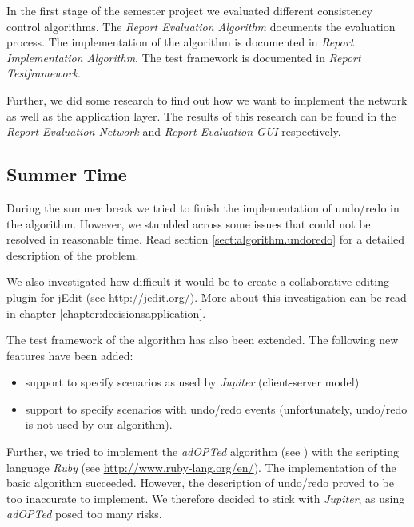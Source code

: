 In the first stage of the semester project we evaluated different
consistency control algorithms. The \emph{Report Evaluation Algorithm}
documents the evaluation process. The implementation of the
algorithm is documented in \emph{Report Implementation Algorithm}. The
test framework is documented in \emph{Report Testframework}.

Further, we did some research to find out how we want to implement the
network as well as the application layer. The results of this research
can be found in the \emph{Report Evaluation Network} and 
\emph{Report Evaluation GUI} respectively.


\subsection{Summer Time}
During the summer break we tried to finish the implementation of undo/redo
in the algorithm. However, we stumbled across some issues that could not
be resolved in reasonable time. Read section \ref{sect:algorithm.undoredo} for
a detailed description of the problem.

We also investigated how difficult it would be to create a collaborative 
editing plugin for jEdit (see \href{http://jedit.org/}{http://jedit.org/}).
More about this investigation can be read in chapter 
\ref{chapter:decisionsapplication}.

The test framework of the algorithm has also been extended. The following 
new features have been added:
\begin{itemize}
 \item support to specify scenarios as used by \emph{Jupiter} (client-server model)
 \item support to specify scenarios with undo/redo events (unfortunately, undo/redo is not used by our algorithm).
\end{itemize}

Further, we tried to implement the \emph{adOPTed} algorithm (see 
\cite{ressel96}) with the scripting language \emph{Ruby} (see
\href{http://www.ruby-lang.org/en/}{http://www.ruby-lang.org/en/}). The
implementation of the basic algorithm succeeded. However, the description
of undo/redo proved to be too inaccurate to implement. We therefore 
decided to stick with \emph{Jupiter}, as using \emph{adOPTed} posed too many
risks.

